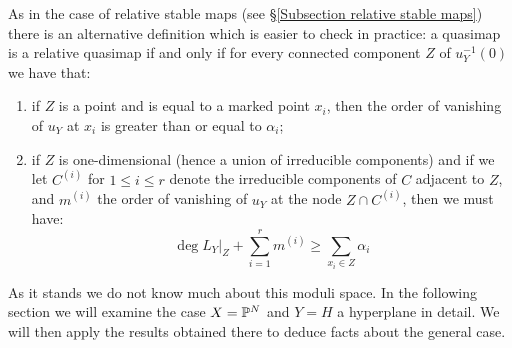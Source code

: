 \begin{remark} As in the case of relative stable maps (see \S \ref{Subsection relative stable maps}) there is an alternative definition which is easier to check in practice: a quasimap is a relative quasimap if and only if for every connected component $Z$ of $u_Y^{-1}(0)$ we have that:
\begin{enumerate}
\item if $Z$ is a point and is equal to a marked point $x_i$, then the order of vanishing of $u_Y$ at $x_i$ is greater than or equal to $\alpha_i$;
\item if $Z$ is one-dimensional (hence a union of irreducible components) and if we let $C^{(i)}$ for $1 \leq i \leq r$ denote the irreducible components of $C$ adjacent to $Z$, and $m^{(i)}$ the order of vanishing of $u_Y$ at the node $Z \cap C^{(i)}$, then we must have:
\begin{equation} \label{Relative quasimap internal component inequality} \deg L_Y|_Z + \sum_{i=1}^r m^{(i)} \geq \sum_{x_i \in Z} \alpha_i \end{equation}
\end{enumerate}
\end{remark}

As it stands we do not know much about this moduli space. In the following section we will examine the case $X=\mathbb P^N$ and $Y=H$ a hyperplane in detail. We will then apply the results obtained there to deduce facts about the general case.
